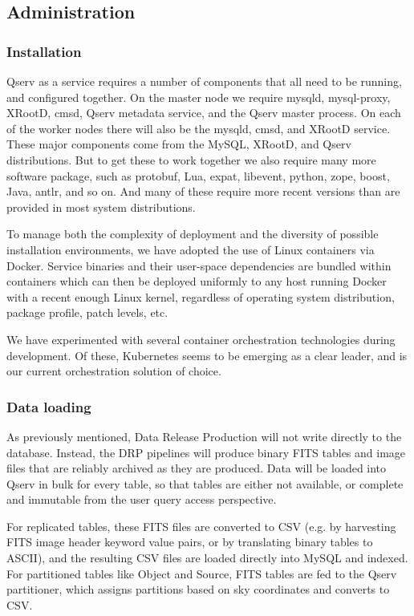 \documentclass[DM,lsstdraft,toc]{lsstdoc}
\begin{document}
\subsection{Administration}\label{administration}

\subsubsection{Installation}\label{installation}

Qserv as a service requires a number of components that all need to be
running, and configured together. On the master node we require mysqld, mysql-proxy,
XRootD, cmsd, Qserv metadata service, and the Qserv master process. On
each of the worker nodes there will also be the mysqld, cmsd, and XRootD
service. These major components come from the MySQL, XRootD, and Qserv
distributions. But to get these to work together we also require many more
software package, such as protobuf, Lua, expat, libevent, python, zope, boost,
Java, antlr, and so on. And many of these require more recent versions than
are provided in most system distributions.

To manage both the complexity of deployment and the diversity of possible
installation environments, we have adopted the use of Linux containers via
Docker.  Service binaries and their user-space dependencies are bundled within
containers which can then be deployed uniformly to any host running Docker
with a recent enough Linux kernel, regardless of operating system
distribution, package profile, patch levels, etc.

We have experimented with several container orchestration technologies
during development.  Of these, Kubernetes seems to be emerging as a clear
leader, and is our current orchestration solution of choice.

\subsubsection{Data loading}\label{data-loading}

As previously mentioned, Data Release Production will not write directly
to the database. Instead, the DRP pipelines will produce binary FITS
tables and image files that are reliably archived as they are produced.
Data will be loaded into Qserv in bulk for every table, so that tables
are either not available, or complete and immutable from the user query
access perspective.

For replicated tables, these FITS files are converted to CSV (e.g. by
harvesting FITS image header keyword value pairs, or by translating
binary tables to ASCII), and the resulting CSV files are loaded directly
into MySQL and indexed. For partitioned tables like Object and Source,
FITS tables are fed to the Qserv partitioner, which assigns partitions
based on sky coordinates and converts to CSV.
\end{document}
